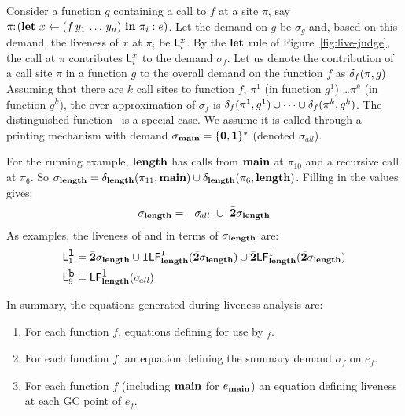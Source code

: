 \documentclass[9pt]{sigplanconf}
\begin{document}
Consider a function $g$ containing a  call to $f$ at a site $\pi$, say
$\pi\!\!:\!(\mbox{$\mathbf{ let}$}~x   \leftarrow   (f\,y_1\,\ldots\,y_n)~\mbox{$\mathbf{ in}$}~\pi_i:e)$.
Let the  demand on $g$  be $\sigma_g$ and,  based on this  demand, the
liveness of  $x$ at $\pi_i$ be  $\mathsf{L}_{{i}}^{x}$.  By the  $\mbox{$\mathbf{ let}$}$ rule of
Figure~\ref{fig:live-judge},    the   call   at    $\pi$   contributes
$\mathsf{L}_{{i}}^{x}$ to  the demand $\sigma_f$. Let us denote the
contribution of a call site $\pi$ in a function $g$ to the overall
demand on the function $f$ as $\delta_{f}({\pi},{g})$. Assuming that  there are $k$
call sites to function $f$, $\pi^1$ (in function $g^1$) \ldots $\pi^k$
(in   function  $g^k$),  the   over-approximation  of   $\sigma_f$  is
$\delta_{f}({\pi^1},{g^1}) \cup \cdots \cup \delta_{f}({\pi^k},{g^k})$.
The distinguished function  \mainpgm\ is a special case.  We assume it
is called through a  printing mechanism with demand $\sigma_{\mathbf{main}} =
\{\mathbf{0},\mathbf{1}\}^\ast$ (denoted $\sigma_{\!all}$).


For  the  running  example,   $\mathbf{length}$  has  calls  from  $\mathbf{main}$  at
$\pi_{10}$ and a recursive call at $\pi_6$.
So $\sigma_{\mathbf{length}} =
     \delta_{\mathbf{length}}({\pi_{11}},{\mathbf{main}})  \cup 
\delta_{\mathbf{length}}({\pi_6},{\mathbf{length}})$.
Filling in  the values gives:
\begin{eqnarray*}
\sigma_{\mathbf{length}}    &=&
 \sigma_{\!all}  ~\cup~{\bar{\mathbf{2}}\sigma_{\mathit{\mathbf{length}}}}
\end{eqnarray*}
As examples, the liveness of  and  in terms
of  $\sigma_{\mathbf{length}}$ are:
\begin{align*}
\mathsf{L}_{{1}}^{\mbox{\tt l}} &= \bar{\mathbf{2}}\sigma_{\mathbf{length}} \cup \mathbf{1}\mathsf{LF}_{\mathit {\mathbf{length}}}^{1}( {\mathit {\bar{\mathbf{2}}}\sigma_{\mathbf{length}}})
  \cup \bar{\mathbf{2}}\mathsf{LF}_{\mathit {\mathbf{length}}}^{1}( {\mathit {\bar{\mathbf{2}}}\sigma_{\mathbf{length}}})
 \\
\mathsf{L}_{{9}}^{\mbox{\tt b}} &= \mathsf{LF}_{\mathit {\mathbf{length}}}^{\mbox{1}}( {\mathit \sigma_{\mathit{\!all}}})
\end{align*}

In summary, the equations generated during liveness analysis are:
\begin{enumerate}
\item   For    each   function   $\mathit{f}$,    equations   defining
 for use by \Lfonly$_{\mathit f}$.
\item  For  each   function  $\mathit{f}$, an  equation  defining
the summary demand  $\sigma_{\mathit f}$ on $e_f$.
\item For each function $\mathit{f}$ (including $\mathbf{main}$ for
  $e_{\mathbf{main}}$) 
an equation defining
  liveness at each GC point of $e_{\mathit f}$.
\end{enumerate}
\end{document}
